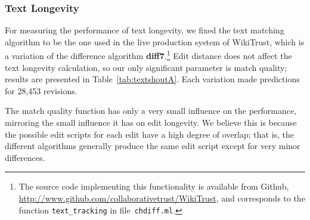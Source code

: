 \subsubsection{Text Longevity}

For measuring the performance of text longevity,
we fixed the text matching algorithm to be the one
used in the live production system of WikiTrust,
which is a variation of the difference algorithm
\textbf{diff7}.\footnote{The source code implementing
this functionality is available from Github,
\url{http://www.github.com/collaborativetrust/WikiTrust},
and corresponds to the function \texttt{text\_tracking}
in file~\texttt{chdiff.ml}.}
Edit distance does not affect the text longevity calculation,
so our only significant parameter is match quality;
results are presented in Table~\ref{tab:textshoutA}.
Each variation made predictions for 28,453 revisions.

The match quality function has only a very small influence on
the performance, mirroring the small influence it has on edit longevity.
We believe this is because the possible edit scripts for
each edit have a high degree of overlap; that is,
the different algorithms generally produce the same edit script
except for very minor differences.


